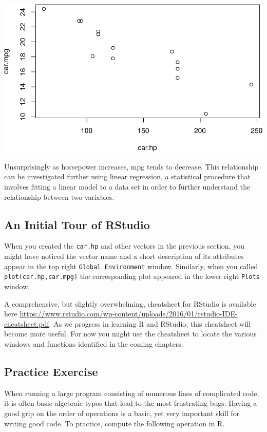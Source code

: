\documentclass[]{krantz}
\begin{document}
\includegraphics{bookdown_files/figure-latex/unnamed-chunk-8-1.pdf}

Unsurprisingly as horsepower increases, mpg tends to decrease. This relationship can be investigated further using linear regression, a statistical procedure that involves fitting a linear model to a data set in order to further understand the relationship between two variables.

\hypertarget{an-initial-tour-of-rstudio}{%
\subsection{An Initial Tour of RStudio}\label{an-initial-tour-of-rstudio}}

When you created the \texttt{car.hp} and other vectors in the previous section, you might have noticed the vector name and a short description of its attributes appear in the top right \texttt{Global\ Environment} window. Similarly, when you called \texttt{plot(car.hp,car.mpg)} the corresponding plot appeared in the lower right \texttt{Plots} window.

A comprehensive, but slightly overwhelming, cheatsheet for RStudio is available here \url{https://www.rstudio.com/wp-content/uploads/2016/01/rstudio-IDE-cheatsheet.pdf}. As we progress in learning R and RStudio, this cheatsheet will become more useful. For now you might use the cheatsheet to locate the various windows and functions identified in the coming chapters.

\hypertarget{practice-exercise}{%
\subsection{Practice Exercise}\label{practice-exercise}}

When running a large program consisting of numerous lines of complicated code, it is often basic algebraic typos that lead to the most frustrating bugs. Having a good grip on the order of operations is a basic, yet very important skill for writing good code. To practice, compute the following operation in R.
\end{document}
